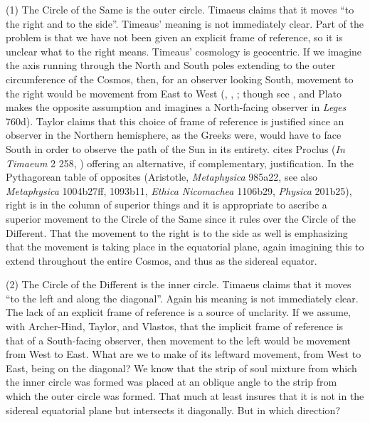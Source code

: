 (1) The Circle of the Same is the outer circle. Timaeus claims that it moves ``to the right and to the side''. Timeaus' meaning is not immediately clear. Part of the problem is that we have not been given an explicit frame of reference, so it is unclear what to the right means. Timeaus' cosmology is geocentric. If we imagine the axis running through the North and South poles extending to the outer circumference of the Cosmos, then, for an observer looking South, movement to the right would be movement from East to West (\citealt[112--3 n5]{Archer-Hind:1888qd}, \citealt[150]{Taylor:1928qb}, \citealt[34 n23]{Vlastos:1975aa}; though see \citealt[122]{Dicks:1970aa}, and Plato makes the opposite assumption and imagines a North-facing observer in \emph{Leges} 760d). Taylor claims that this choice of frame of reference is justified since an observer in the Northern hemisphere, as the Greeks were, would have to face South in order to observe the path of the Sun in its entirety. \citet[74]{Cornford:1935fk} cites Proclus (\emph{In Timaeum} 2 258, \citealt{Diehl:1903re}) offering an alternative, if complementary, justification. In the Pythagorean table of opposites (Aristotle, \emph{Metaphysica} 985a22, see also \emph{Metaphysica} 1004b27ff, 1093b11, \emph{Ethica Nicomachea} 1106b29, \emph{Physica} 201b25), right is in the column of superior things and it is appropriate to ascribe a superior movement to the Circle of the Same since it rules over the Circle of the Different. That the movement to the right is to the side as well is emphasizing that the movement is taking place in the equatorial plane, again imagining this to extend throughout the entire Cosmos, and thus as the sidereal equator. 

(2) The Circle of the Different is the inner circle. Timaeus claims that it moves ``to the left and along the diagonal''. Again his meaning is not immediately clear. The lack of an explicit frame of reference is a source of unclarity. If we assume, with Archer-Hind, Taylor, and Vlastos, that the implicit frame of reference is that of a South-facing observer, then movement to the left would be movement from West to East. What are we to make of its leftward movement, from West to East, being on the diagonal? We know that the strip of soul mixture from which the inner circle was formed was placed at an oblique angle to the strip from which the outer circle was formed. That much at least insures that it is not in the sidereal equatorial plane but intersects it diagonally. But in which direction?

